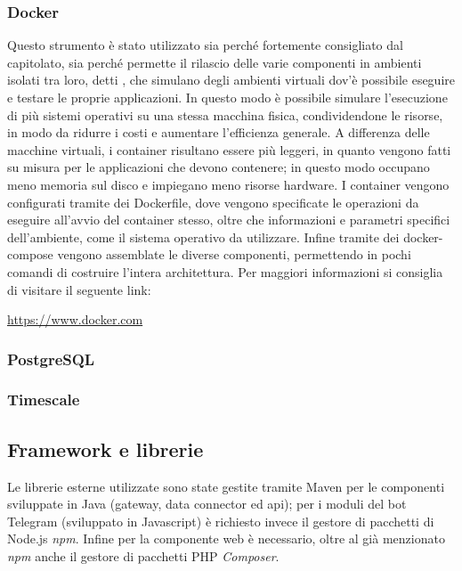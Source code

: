		\subsubsection{Docker}
			Questo strumento è stato utilizzato sia perché fortemente consigliato dal capitolato, sia perché permette il rilascio delle varie componenti in ambienti isolati tra loro, detti , che simulano degli ambienti virtuali dov'è possibile eseguire e testare le proprie applicazioni.
			\newline
			In questo modo è possibile simulare l'esecuzione di più sistemi operativi su una stessa macchina fisica, condividendone le risorse, in modo da ridurre i costi e aumentare l'efficienza generale.
			\newline
			A differenza delle macchine virtuali, i container risultano essere più leggeri, in quanto vengono fatti su misura per le applicazioni che devono contenere; in questo modo occupano meno memoria sul disco e impiegano meno risorse hardware.
			\newline
			I container vengono configurati tramite dei Dockerfile, dove vengono specificate le operazioni da eseguire all'avvio del container stesso, oltre che informazioni e parametri specifici dell'ambiente, come il sistema operativo  da utilizzare. Infine tramite dei docker-compose vengono assemblate le diverse componenti, permettendo in pochi comandi di costruire l'intera architettura.
			\newline
			Per maggiori informazioni si consiglia di visitare il seguente link:
			\newline
			\begin{center}
				\url{https://www.docker.com}
			\end{center}
		\subsubsection{PostgreSQL}
			
		\subsubsection{Timescale}
			
	\subsection{Framework e librerie}
		Le librerie esterne utilizzate sono state gestite tramite Maven per le componenti sviluppate in Java (gateway, data connector ed api); per i moduli del bot Telegram (sviluppato in Javascript) è richiesto invece il gestore di pacchetti di Node.js \textit{npm}. Infine per la componente web è necessario, oltre al già menzionato \textit{npm} anche il gestore di pacchetti PHP \textit{Composer}.

